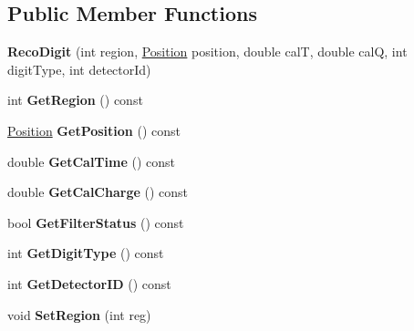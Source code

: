 \subsection*{Public Member Functions}
\begin{DoxyCompactItemize}
\item 
\hypertarget{classRecoDigit_a101154b65ec76df7cc97c14f6d1dc6c6}{
{\bfseries RecoDigit} (int region, \hyperlink{classPosition}{Position} position, double calT, double calQ, int digitType, int detectorId)}
\label{classRecoDigit_a101154b65ec76df7cc97c14f6d1dc6c6}

\item 
\hypertarget{classRecoDigit_a232afcbdf7e4d02806ad45c16d66f471}{
int {\bfseries GetRegion} () const }
\label{classRecoDigit_a232afcbdf7e4d02806ad45c16d66f471}

\item 
\hypertarget{classRecoDigit_ac0b01228a2338ce349faf7f155a53409}{
\hyperlink{classPosition}{Position} {\bfseries GetPosition} () const }
\label{classRecoDigit_ac0b01228a2338ce349faf7f155a53409}

\item 
\hypertarget{classRecoDigit_a0233d80913069093a4c280cd1bc9ffa6}{
double {\bfseries GetCalTime} () const }
\label{classRecoDigit_a0233d80913069093a4c280cd1bc9ffa6}

\item 
\hypertarget{classRecoDigit_a5b6de9e5c454aba68e9adae03608b37d}{
double {\bfseries GetCalCharge} () const }
\label{classRecoDigit_a5b6de9e5c454aba68e9adae03608b37d}

\item 
\hypertarget{classRecoDigit_a4afdb96357a5f77b51bc3505001406b1}{
bool {\bfseries GetFilterStatus} () const }
\label{classRecoDigit_a4afdb96357a5f77b51bc3505001406b1}

\item 
\hypertarget{classRecoDigit_a2802e24aaeba074aefc4d8c61a779888}{
int {\bfseries GetDigitType} () const }
\label{classRecoDigit_a2802e24aaeba074aefc4d8c61a779888}

\item 
\hypertarget{classRecoDigit_aa8f0ef1d80bdfa8cb97913d339b015be}{
int {\bfseries GetDetectorID} () const }
\label{classRecoDigit_aa8f0ef1d80bdfa8cb97913d339b015be}

\item 
\hypertarget{classRecoDigit_a9ca1c7f5a86fca02e7a95337f8f6e0a1}{
void {\bfseries SetRegion} (int reg)}
\label{classRecoDigit_a9ca1c7f5a86fca02e7a95337f8f6e0a1}


\end{DoxyCompactItemize}

